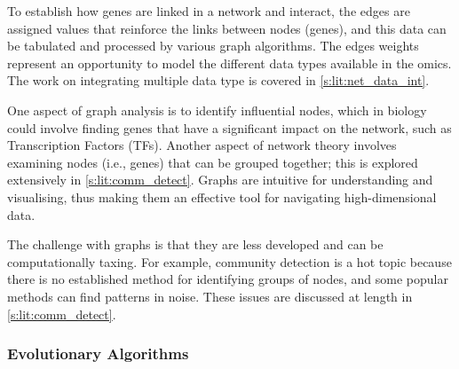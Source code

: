 To establish how genes are linked in a network and interact, the edges are assigned values that reinforce the links between nodes (genes), and this data can be tabulated and processed by various graph algorithms. The edges weights represent an opportunity to model the different data types available in the omics. The work on integrating multiple data type is covered in \cref{s:lit:net_data_int}.

One aspect of graph analysis is to identify influential nodes, which in biology could involve finding genes that have a significant impact on the network, such as Transcription Factors (TFs). Another aspect of network theory involves examining nodes (i.e., genes) that can be grouped together; this is explored extensively in \cref{s:lit:comm_detect}. Graphs are intuitive for understanding and visualising, thus making them an effective tool for navigating high-dimensional data.

The challenge with graphs is that they are less developed and can be computationally taxing. For example, community detection is a hot topic because there is no established method for identifying groups of nodes, and some popular methods can find patterns in noise. These issues are discussed at length in \cref{s:lit:comm_detect}.



\subsubsection{Evolutionary Algorithms} \label{s:lit:ea_overview}


